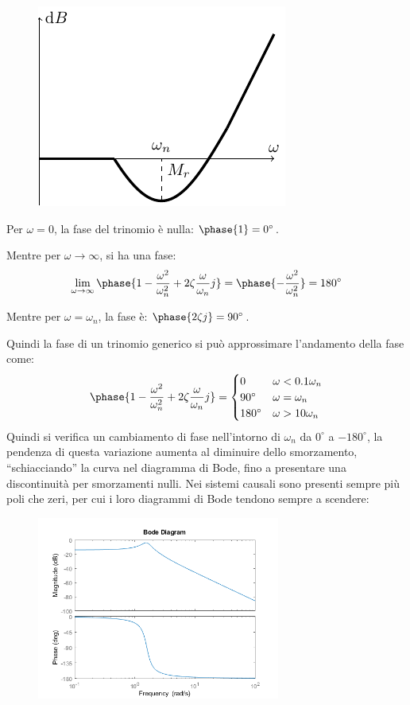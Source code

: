 \documentclass{article}
\numberwithin{equation}{subsection}
\begin{document}
\begin{figure}[H]%
    \centering
    \includegraphics{modulo-bode-3.pdf}%
\end{figure}

Per $\omega=0$, la fase del trinomio è nulla: $\phase{1}=0^{\circ}$. 


Mentre per $\omega\to\infty$, si ha una fase: 
\begin{equation*}
    \displaystyle\lim_{\omega\to\infty}\phase{1-\displaystyle\frac{\omega^2}{\omega_n^2}+2\zeta\frac{\omega}{\omega_n}j}=\phase{-\displaystyle\frac{\omega^2}{\omega_n^2}}=180^{\circ}
\end{equation*}

Mentre per $\omega=\omega_n$, la fase è: $\phase{2\zeta j}=90^{\circ}$. 


Quindi la fase di un trinomio generico si può approssimare l'andamento della fase come:
\begin{equation}
    \phase{1-\displaystyle\frac{\omega^2}{\omega_n^2}+2\zeta\frac{\omega}{\omega_n}j}=\begin{cases}
        0&\omega<0.1\omega_n\\
        90^{\circ}&\omega=\omega_n\\
        180^{\circ}&\omega>10\omega_n
    \end{cases}
\end{equation} 
Quindi si verifica un cambiamento di fase nell'intorno di $\omega_n$ da $0^{\circ}$ a $-180^{\circ}$, la pendenza di questa variazione aumenta al diminuire dello 
smorzamento, ``schiacciando'' la curva nel diagramma di Bode, fino a presentare una 
discontinuità per smorzamenti nulli.  
Nei sistemi causali sono presenti sempre più poli che zeri, per cui i loro diagrammi di Bode tendono sempre a scendere: 
\begin{figure}[H]%
    \centering
    \includegraphics[width=8cm]{BodeRisonanza}%
\end{figure}
\end{document}
